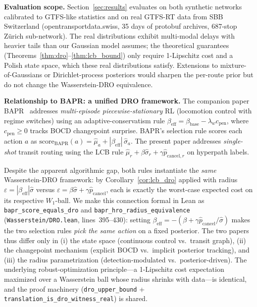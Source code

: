 \documentclass[11pt]{article}
\theoremstyle{definition}
\theoremstyle{remark}
\begin{document}
\textbf{Evaluation scope.}
Section~\ref{sec:results} evaluates on both synthetic networks
calibrated to GTFS-like statistics and on real GTFS-RT data from SBB
Switzerland (opentransportdata.swiss, 35 days of protobuf archives,
687-stop Z\"urich sub-network). The real distributions exhibit
multi-modal delays with heavier tails than our Gaussian model
assumes; the theoretical guarantees
(Theorems~\ref{thm:dro}--\ref{thm:lcb_bound}) only require 1-Lipschitz
cost and a Polish state space, which these real distributions
satisfy. Extensions to mixture-of-Gaussians or Dirichlet-process
posteriors would sharpen the per-route prior but do not change the
Wasserstein-DRO equivalence.

\textbf{Relationship to BAPR: a unified DRO framework.}
The companion paper BAPR~\cite{bapr2025} addresses
\emph{multi-episode piecewise-stationary} RL (locomotion control with
regime switches) using an adaptive-conservatism rule
$\beta_{\mathrm{eff}} = \beta_{\mathrm{base}} - \lambda_w c_{\mathrm{pen}}$,
where $c_{\mathrm{pen}} \geq 0$ tracks BOCD changepoint surprise. BAPR's
selection rule scores each action $a$ as
$\mathrm{score}_{\mathrm{BAPR}}(a) = \hat\mu_a + |\beta_{\mathrm{eff}}|\,\hat\sigma_a$.
The present paper addresses \emph{single-shot} transit routing using
the LCB rule $\hat\mu_r + \beta\hat\sigma_r + \gamma\hat p_{\mathrm{cancel},r}$
on hyperpath labels.

Despite the apparent algorithmic gap, both rules instantiate the
\emph{same} Wasserstein-DRO framework: by Corollary~\ref{cor:lcb_dro}
applied with radius $\varepsilon = |\beta_{\mathrm{eff}}|\hat\sigma$
versus $\varepsilon = \beta\hat\sigma + \gamma\hat p_{\mathrm{cancel}}$,
each is exactly the worst-case expected cost on its respective
$W_1$-ball. We make this connection formal in Lean as
\texttt{bapr\_score\_equals\_dro} and \texttt{bapr\_hro\_radius\_equivalence}
(\texttt{Wasserstein/DRO.lean}, lines~395--430): setting
$\beta_{\mathrm{eff}} = -(\beta + \gamma\hat p_{\mathrm{cancel}}/\hat\sigma)$
makes the two selection rules \emph{pick the same action} on a fixed
posterior. The two papers thus differ only in (i) the state space
(continuous control vs.\ transit graph), (ii) the changepoint mechanism
(explicit BOCD vs.\ implicit posterior tracking), and (iii) the
radius parametrization (detection-modulated vs.\ posterior-driven).
The underlying robust-optimization principle---a 1-Lipschitz cost
expectation maximized over a Wasserstein ball whose radius shrinks
with data---is identical, and the proof machinery
(\texttt{dro\_upper\_bound} + \texttt{translation\_is\_dro\_witness\_real})
is shared.
\end{document}
